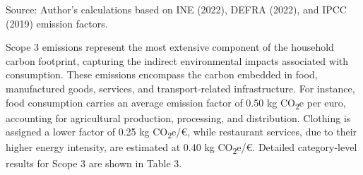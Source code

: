 \documentclass[12pt,a4paper]{article}%
\begin{document}
\begin{table}[h]
\centering
\captionsetup{justification=raggedright,singlelinecheck=false} 
\caption{\small Indirect Emissions from Heating and Cooling (Scope 2)}\label{tab:scope2}
\raggedright

\vspace{0.3cm}
\footnotesize{Source: Author's calculations based on INE (2022), DEFRA (2022), and IPCC (2019) emission factors.}
\end{table}

Scope 3 emissions represent the most extensive component of the household carbon footprint, capturing the indirect environmental impacts associated with consumption. These emissions encompass the carbon embedded in food, manufactured goods, services, and transport-related infrastructure. For instance, food consumption carries an average emission factor of 0.50 kg CO\textsubscript{2}e per euro, accounting for agricultural production, processing, and distribution. Clothing is assigned a lower factor of 0.25 kg CO\textsubscript{2}e/€, while restaurant services, due to their higher energy intensity, are estimated at 0.40 kg CO\textsubscript{2}e/€. Detailed category-level results for Scope 3 are shown in Table 3.
\end{document}
